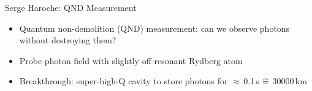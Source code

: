 \begin{frame}[t]{Serge Haroche: QND Measurement}
  \begin{minipage}[t][4.5cm][t]{\textwidth-1.5cm}
    \begin{itemize}
      \item Quantum non-demolition (QND) measurement: can we observe photons
        without destroying them?
      \item<2-> Probe photon field with  slightly off-resonant Rydberg atom
      \item<3-> Breakthrough: super-high-Q cavity to store photons for
        $\approx\,$0.1\,s $\equalhat$ 30000\,km
    \end{itemize}  
  \end{minipage}
  \begin{minipage}[t][0.2\textheight][t]{\textwidth}
  \end{minipage}
\end{frame}

